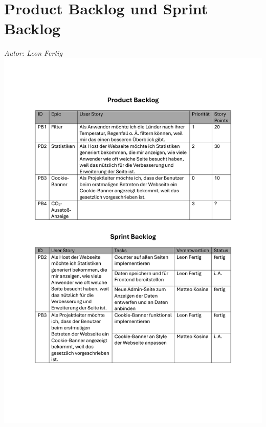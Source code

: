 \documentclass[12pt]{article}
\begin{document}
\section{Product Backlog und Sprint Backlog}
{\it Autor: Leon Fertig}
\newline
\includegraphics[width=\textwidth]{Planungsdokumente/graphics/Backlog.pdf}
\end{document}

